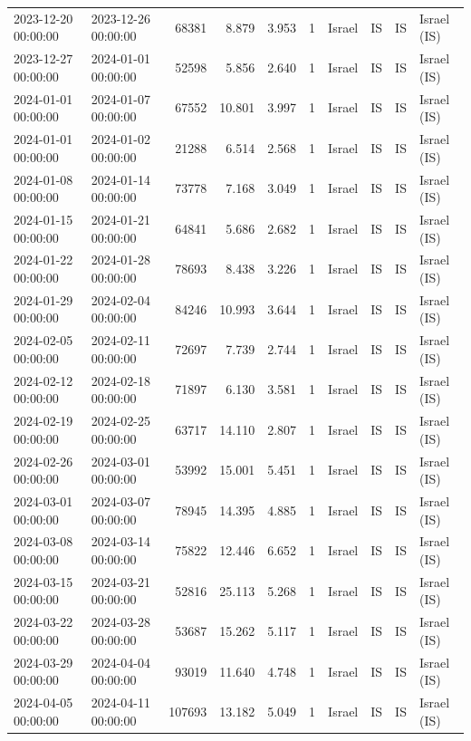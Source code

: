 \begin{tabular}{llrrrlllll}
2023-12-20 00:00:00 & 2023-12-26 00:00:00 & 68381 & 8.879 & 3.953 & 1 & Israel & IS & IS & Israel (IS) \\
2023-12-27 00:00:00 & 2024-01-01 00:00:00 & 52598 & 5.856 & 2.640 & 1 & Israel & IS & IS & Israel (IS) \\
2024-01-01 00:00:00 & 2024-01-07 00:00:00 & 67552 & 10.801 & 3.997 & 1 & Israel & IS & IS & Israel (IS) \\
2024-01-01 00:00:00 & 2024-01-02 00:00:00 & 21288 & 6.514 & 2.568 & 1 & Israel & IS & IS & Israel (IS) \\
2024-01-08 00:00:00 & 2024-01-14 00:00:00 & 73778 & 7.168 & 3.049 & 1 & Israel & IS & IS & Israel (IS) \\
2024-01-15 00:00:00 & 2024-01-21 00:00:00 & 64841 & 5.686 & 2.682 & 1 & Israel & IS & IS & Israel (IS) \\
2024-01-22 00:00:00 & 2024-01-28 00:00:00 & 78693 & 8.438 & 3.226 & 1 & Israel & IS & IS & Israel (IS) \\
2024-01-29 00:00:00 & 2024-02-04 00:00:00 & 84246 & 10.993 & 3.644 & 1 & Israel & IS & IS & Israel (IS) \\
2024-02-05 00:00:00 & 2024-02-11 00:00:00 & 72697 & 7.739 & 2.744 & 1 & Israel & IS & IS & Israel (IS) \\
2024-02-12 00:00:00 & 2024-02-18 00:00:00 & 71897 & 6.130 & 3.581 & 1 & Israel & IS & IS & Israel (IS) \\
2024-02-19 00:00:00 & 2024-02-25 00:00:00 & 63717 & 14.110 & 2.807 & 1 & Israel & IS & IS & Israel (IS) \\
2024-02-26 00:00:00 & 2024-03-01 00:00:00 & 53992 & 15.001 & 5.451 & 1 & Israel & IS & IS & Israel (IS) \\
2024-03-01 00:00:00 & 2024-03-07 00:00:00 & 78945 & 14.395 & 4.885 & 1 & Israel & IS & IS & Israel (IS) \\
2024-03-08 00:00:00 & 2024-03-14 00:00:00 & 75822 & 12.446 & 6.652 & 1 & Israel & IS & IS & Israel (IS) \\
2024-03-15 00:00:00 & 2024-03-21 00:00:00 & 52816 & 25.113 & 5.268 & 1 & Israel & IS & IS & Israel (IS) \\
2024-03-22 00:00:00 & 2024-03-28 00:00:00 & 53687 & 15.262 & 5.117 & 1 & Israel & IS & IS & Israel (IS) \\
2024-03-29 00:00:00 & 2024-04-04 00:00:00 & 93019 & 11.640 & 4.748 & 1 & Israel & IS & IS & Israel (IS) \\
2024-04-05 00:00:00 & 2024-04-11 00:00:00 & 107693 & 13.182 & 5.049 & 1 & Israel & IS & IS & Israel (IS) \\

\end{tabular}
